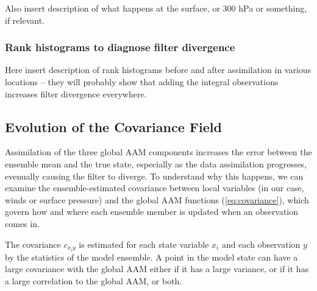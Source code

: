 \textcolor{alert}{Also insert description of what happens at the surface, or 300 hPa or something, if relevant.}


\subsubsection{Rank histograms to diagnose filter divergence}

\textcolor{alert}{Here insert description of rank histograms before and after assimilation in various locations -- they will probably show that adding the integral observations increases filter divergence everywhere.}


\subsection{Evolution of the  Covariance Field}

Assimilation of the three global AAM components increases the error between the ensemble mean and the true state, especially as the data assimilation progresses, evenually causing the filter to diverge.
To understand why this happens, we can examine the ensemble-estimated covariance between local variables (in our case, winds or surface pressure) and the global AAM functions (\ref{eq:covariance}), which govern how and where each ensemble member is updated when an observation comes in. 

The covariance $c_{x_iy}$ is estimated for each state variable $x_i$ and each observation $y$ by the statistics of the model ensemble.  
A point in the model state can have a large covariance with the global AAM either if it has a large variance, or if it has a large correlation to the global AAM, or both.

